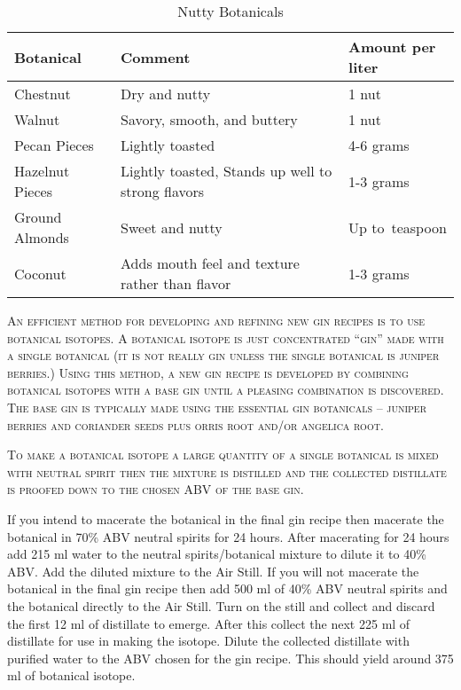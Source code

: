 \documentclass[letterpaper]{recipePMG}
\newcommand{\half}{\nicefrac{1}{2} \,}
\begin{document}
\begin{table}[H]
    \centering
    \caption{Nutty Botanicals}
    \begin{tabular}{@{}p{1.25in}p{3in}p{1.25in}@{}}
        \toprule
      Botanical &  Comment & Amount per liter \\
        \midrule
		Chestnut & Dry and nutty & 1 nut \\
		Walnut	& Savory, smooth, and buttery & 1 nut \\
		Pecan Pieces & Lightly toasted & 4-6 grams \\
		Hazelnut Pieces & Lightly toasted, Stands up well to strong flavors & 1-3 grams \\
		Ground Almonds & Sweet and nutty & Up to \half teaspoon \\
		Coconut & Adds mouth feel and texture rather than flavor & 1-3 grams \\

\end{tabular}
    \label{tab:nutty}
\end{table}	

\newpage


\textsc{An efficient method for developing and refining new gin recipes is to use botanical isotopes. A botanical isotope is just concentrated ``gin'' made with a single botanical (it is not really gin unless the single botanical is juniper berries.) Using this method, a new gin recipe is developed by combining botanical isotopes with a base gin until a pleasing combination is discovered. The base gin is typically made using the essential gin botanicals -- juniper berries and coriander seeds plus orris root and/or angelica root.} 

\textsc{To make a botanical isotope a large quantity of a single botanical is mixed with neutral spirit then the mixture is distilled and the collected distillate is proofed down to the chosen ABV of the base gin.}


If you intend to macerate the botanical in the final gin recipe then macerate the botanical in 70\% ABV neutral spirits for 24 hours. After macerating for 24 hours add 215 ml water to the neutral spirits/botanical mixture to dilute it to 40\% ABV. Add the diluted mixture to the Air Still. If you will not macerate the botanical in the final gin recipe then add 500 ml of 40\% ABV neutral spirits and the botanical directly to the Air Still. Turn on the still and collect and discard the first 12 ml of distillate to emerge.  After this collect the next 225 ml of distillate for use in making the isotope. Dilute the collected distillate with purified water to the ABV chosen for the gin recipe. This should yield around 375 ml of botanical isotope. 
 
\end{document}
